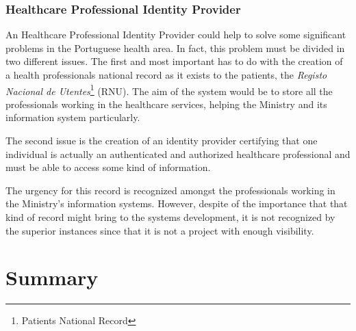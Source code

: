 \subsubsection{Healthcare Professional Identity Provider}\label{sec:hpip}

An Healthcare Professional Identity Provider could help to solve some significant problems in the Portuguese health area. In fact, this problem must be divided in two different issues. The first and most important has to do with the creation of a health professionals national record as it exists to the patients, the \textit{Registo Nacional de Utentes}\footnote{Patients National Record} (RNU). The aim of the system would be to store all the professionals working in the healthcare services, helping the Ministry and its information system particularly.

The second issue is the creation of an identity provider certifying that one individual is actually an authenticated and authorized healthcare professional and must be able to access some kind of information.

The urgency for this record is recognized amongst the professionals working in the Ministry's information systems. However, despite of the importance that that kind of record might bring to the systems development, it is not recognized by the superior instances since that it is not a project with enough visibility.






\begin{landscape}
\centering     %
\end{landscape}

\section{Summary}

